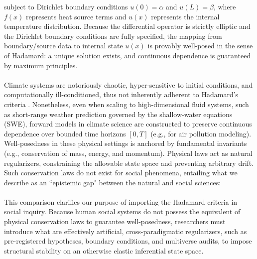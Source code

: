 \documentclass{article}
\theoremstyle{definition}
\begin{document}
\noindent
subject to Dirichlet boundary conditions $u(0) = \alpha$ and $u(L) = \beta$, where $f(x)$ represents heat source terms and $u(x)$ represents the internal temperature distribution. Because the differential operator is strictly elliptic and the Dirichlet boundary conditions are fully specified, the mapping from boundary/source data to internal state $u(x)$ is provably well-posed in the sense of Hadamard: a unique solution exists, and continuous dependence is guaranteed by maximum principles. \\
\\
Climate systems are notoriously chaotic, hyper-sensitive to initial conditions, and computationally ill-conditioned, thus not inherently adherent to Hadamard's criteria \cite{LT16}. Nonetheless, even when scaling to high-dimensional fluid systems, such as short-range weather prediction governed by the shallow-water equations (SWE), forward models in climate science are constructed to preserve continuous dependence over bounded time horizons $[0, T]$ (e.g., \cite{San+05} for air pollution modeling). Well-posedness in these physical settings is anchored by fundamental invariants (e.g., conservation of mass, energy, and momentum). Physical laws act as natural regularizers, constraining the allowable state space and preventing arbitrary drift. Such conservation laws do not exist for social phenomena, entailing what we describe as an ``epistemic gap" between the natural and social sciences: \\

\noindent{} \\

\noindent
This comparison clarifies our purpose of importing the Hadamard criteria in social inquiry. Because human social systems do not possess the equivalent of physical conservation laws to guarantee well-posedness, researchers must introduce what are effectively artificial, cross-paradigmatic regularizers, such as pre-registered hypotheses, boundary conditions, and multiverse audits, to impose structural stability on an otherwise elastic inferential state space.
\end{document}
